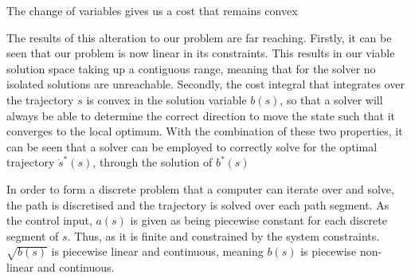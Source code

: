 The change of variables gives us a cost that remains convex

The results of this alteration to our problem are far reaching. Firstly, it can be seen that our problem is now linear in its constraints. This results in our viable solution space taking up a contiguous range, meaning that for the solver no isolated solutions are unreachable.
Secondly, the cost integral that integrates over the trajectory $s$ is convex in the solution variable $b(s)$, so that a solver will always be able to determine the correct direction to move the state such that it converges to the local optimum.
With the combination of these two properties, it can be seen that a solver can be employed to correctly solve for the optimal trajectory $\dot{s}^*(s)$, through the solution of $b^*(s)$

In order to form a discrete problem that a computer can iterate over and solve, the path is discretised and the trajectory is solved over each path segment. As the control input, $a(s)$ is given as being piecewise constant for each discrete segment of $s$. Thus, as it is finite and constrained by the system constraints. $\sqrt{b(s)}$ is piecewise linear and continuous, meaning $b(s)$ is piecewise non-linear and continuous. 